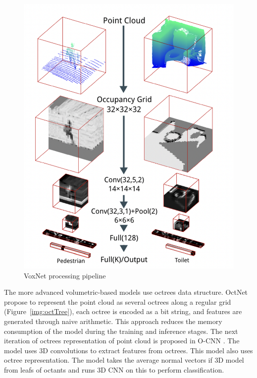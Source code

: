 \begin{figure}[htbp]
    \centerline{\includegraphics[scale=0.4]{Figures/VoxNet.png}}
    \caption{VoxNet processing pipeline  \parencite{maturana_voxnet_2015}}
    \label{img:voxnet}
\end{figure}

The more advanced volumetric-based models use octrees data structure. OctNet \parencite{riegler_octnet_2017} propose to represent the point cloud as several octrees along a regular grid (Figure~\ref{img:octTree}), each octree is encoded as a bit string, and features are generated through naive arithmetic. This approach reduces the memory consumption of the model during the training and inference stages.
The next iteration of octrees representation of point cloud is proposed in O-CNN \parencite{wang_o-cnn_2017}. The model uses 3D convolutions to extract features from octrees. This model also uses octree representation. The model takes the average normal vectors if 3D model from leafs of octants and runs 3D CNN on this to perform classification.

